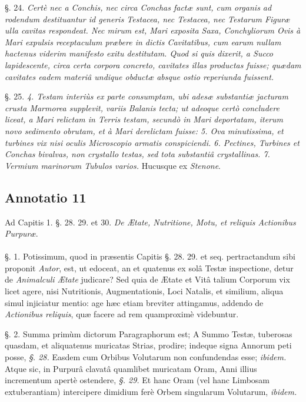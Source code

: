 \documentclass[a4paper, 11pt, oneside, polutonikogreek, german]{article}
\begin{document}
§. 24. \emph{Certè nec a Conchis, nec circa Conchas factæ sunt, cum organis ad rodendum destituantur id generis Testacea, nec Testacea, nec Testarum Figuræ ulla cavitas respondeat. Nec mirum est, Mari exposita Saxa, Conchyliorum Ovis à Mari expulsis receptaculum præbere in dictis Cavitatibus, cum earum nullam hactenus viderim manifesto exitu destitutam. Quod si quis dixerit, a Succo lapidescente, circa certa corpora concreto, cavitates illas productas fuisse; quædam cavitates eadem materiâ undique obductæ absque ostio reperiunda fuissent.}

§. 25. \emph{4. Testam interiùs ex parte consumptam, ubi adesæ substantiæ jacturam crusta Marmorea supplevit, variis Balanis tecta; ut adeoque certò concludere liceat, a Mari relictam in Terris testam, secundò in Mari deportatam, iterum novo sedimento obrutam, et à Mari derelictam fuisse: 5. Ova minutissima, et turbines vix nisi oculis Microscopio armatis conspiciendi. 6. Pectines, Turbines et Conchas bivalvas, non crystallo testas, sed tota substantiâ crystallinas. 7. Vermium marinorum Tubulos varios.} Hucusque ex \emph{Stenone}.

\subsection{Annotatio 11}
\begin{center}
Ad Capitis 1. §. 28. 29. et 30. \emph{De Ætate, Nutritione, Motu, et reliquis Actionibus Purpuræ}.
\end{center}
\paragraph{}
§. 1. Potissimum, quod in præsentis Capitis §. 28. 29. et seq. pertractandum sibi proponit \emph{Autor}, est, ut edoceat, an et quatenus ex solâ Testæ inspectione, detur de \emph{Animalculi Ætate} judicare? Sed quia de Ætate et Vitâ talium Corporum vix licet agere, nisi Nutritionis, Augmentationis, Loci Natalis, et similium, aliqua simul injiciatur mentio: age hæc etiam breviter attingamus, addendo de \emph{Actionibus reliquis}, quæ facere ad rem quamproximè videbuntur.

§. 2. Summa primùm dictorum Paragraphorum est; A Summo Testæ, tuberosas quasdam, et aliquatenus muricatas Strias, prodire; indeque signa Annorum peti posse, \emph{§. 28.} Easdem cum Orbibus Volutarum non confundendas esse; \emph{ibidem.} Atque sic, in Purpurâ clavatâ quamlibet muricatam Oram, Anni illius incrementum apertè ostendere, \emph{§. 29.} Et hanc Oram (vel hanc Limbosam extuberantiam) intercipere dimidium ferè Orbem singularum Volutarum, \emph{ibidem.}
\end{document}
